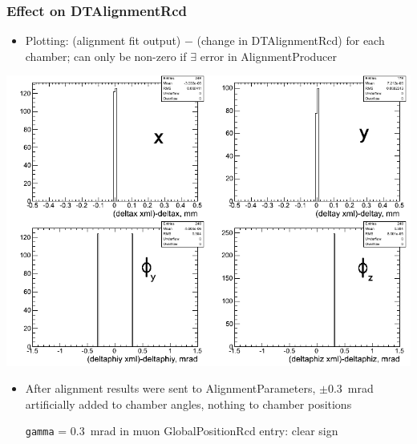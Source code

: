 \documentclass[compress]{beamer}
\begin{document}
\begin{frame}
\frametitle{Effect on DTAlignmentRcd}

\begin{itemize}
\item Plotting: (alignment fit output) $-$ (change in DTAlignmentRcd) for each chamber; can only be non-zero if $\exists$ error in AlignmentProducer
\end{itemize}

\vspace{-0.3 cm}
\begin{center}
\includegraphics[width=0.75\linewidth]{delta_deltas__g6__05.png}
\end{center}

\vspace{-0.3 cm}
\begin{itemize}
\item After alignment results were sent to AlignmentParameters,
  \mbox{$\pm$0.3~mrad\hspace{-0.5 cm}} \\ artificially added to chamber angles, nothing to chamber
  positions

{\tt gamma} = 0.3~mrad in muon GlobalPositionRcd entry: clear sign
\end{itemize}
\end{frame}
\end{document}
